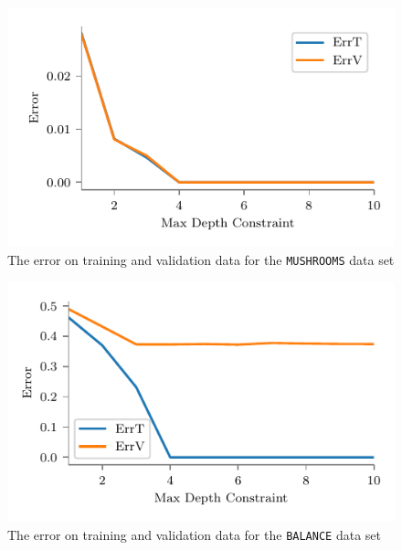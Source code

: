 \documentclass[screen, authorversion, nonacm, sigconf]{acmart}
\begin{document}
\begin{figure}[H]
  \centering
  \includegraphics[width=\columnwidth]{figures/chart_errt_errv_mushrooms_ours.pdf}
  \caption{The error on training and validation data for the \texttt{MUSHROOMS} data set}
  \label{fig:mushroomserrterrv}
\end{figure}

\begin{figure}[H]
  \centering
  \includegraphics[width=\columnwidth]{figures/chart_errt_errv_balance_ours.pdf}
  \caption{The error on training and validation data for the \texttt{BALANCE} data set}
  \label{fig:balanceerrterrv}
\end{figure}
\end{document}
